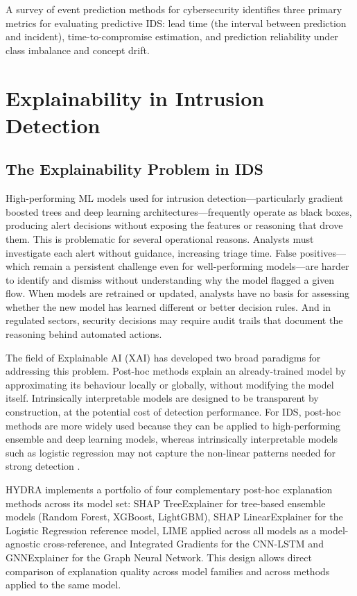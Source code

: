 \documentclass[12pt,a4paper]{report}
\begin{document}
A survey of event prediction methods for cybersecurity \citep{sonmez2023} identifies three primary metrics for evaluating predictive IDS: lead time (the interval between prediction and incident), time-to-compromise estimation, and prediction reliability under class imbalance and concept drift.

\section{Explainability in Intrusion Detection}
\label{sec:xai}

\subsection{The Explainability Problem in IDS}
\label{sec:xai-problem}

High-performing ML models used for intrusion detection---particularly gradient boosted trees and deep learning architectures---frequently operate as black boxes, producing alert decisions without exposing the features or reasoning that drove them. This is problematic for several operational reasons. Analysts must investigate each alert without guidance, increasing triage time. False positives---which remain a persistent challenge even for well-performing models---are harder to identify and dismiss without understanding why the model flagged a given flow. When models are retrained or updated, analysts have no basis for assessing whether the new model has learned different or better decision rules. And in regulated sectors, security decisions may require audit trails that document the reasoning behind automated actions.

The field of Explainable AI (XAI) has developed two broad paradigms for addressing this problem. Post-hoc methods explain an already-trained model by approximating its behaviour locally or globally, without modifying the model itself. Intrinsically interpretable models are designed to be transparent by construction, at the potential cost of detection performance. For IDS, post-hoc methods are more widely used because they can be applied to high-performing ensemble and deep learning models, whereas intrinsically interpretable models such as logistic regression may not capture the non-linear patterns needed for strong detection \citep{adadi2018}.

HYDRA implements a portfolio of four complementary post-hoc explanation methods across its model set: SHAP TreeExplainer for tree-based ensemble models (Random Forest, XGBoost, LightGBM), SHAP LinearExplainer for the Logistic Regression reference model, LIME applied across all models as a model-agnostic cross-reference, and Integrated Gradients for the CNN-LSTM and GNNExplainer for the Graph Neural Network. This design allows direct comparison of explanation quality across model families and across methods applied to the same model.
\end{document}
